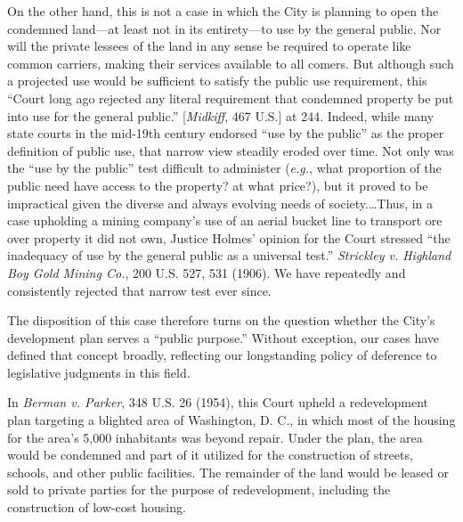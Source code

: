 On the other hand, this is not a case in which the City is planning to open the
condemned land---at least not in its entirety---to use by the general public.
Nor will the private lessees of the land in any sense be required to operate
like common carriers, making their services available to all comers. But
although such a projected use would be sufficient to satisfy the public use
requirement, this ``Court long ago rejected any literal requirement that
condemned property be put into use for the general public.'' [\textit{Midkiff},
467 U.S.] at 244. Indeed, while many state courts in the mid-19th century
endorsed ``use by the public'' as the proper definition of public use, that
narrow view steadily eroded over time. Not only was the ``use by the public''
test difficult to administer (\textit{e.g.}, what proportion of the public need
have access to the property? at what price?), but it proved to be impractical
given the diverse and always evolving needs of society.\ldots Thus, in a case
upholding a mining company's use of an aerial bucket line to transport ore over
property it did not own, Justice Holmes' opinion for the Court stressed ``the
inadequacy of use by the general public as a universal test.'' \textit{Strickley
v. Highland Boy Gold Mining Co.}, 200 U.S. 527, 531 (1906). We have repeatedly
and consistently rejected that narrow test ever since.

The disposition of this case therefore turns on the question whether the City's
development plan serves a ``public purpose.'' Without exception, our cases have
defined that concept broadly, reflecting our longstanding policy of deference to
legislative judgments in this field.

In \textit{Berman v. Parker}, 348 U.S. 26 (1954), this Court upheld a
redevelopment plan targeting a blighted area of Washington, D. C., in which most
of the housing for the area's 5,000 inhabitants was beyond repair. Under the
plan, the area would be condemned and part of it utilized for the construction
of streets, schools, and other public facilities. The remainder of the land
would be leased or sold to private parties for the purpose of redevelopment,
including the construction of low-cost housing.

